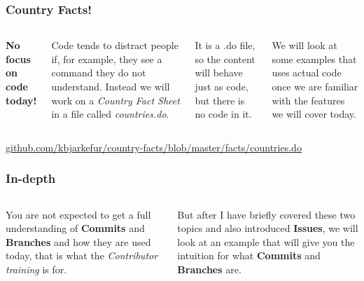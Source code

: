 \documentclass[aspectratio=169]{beamer} %
\newcommand{\trainingURL}[1]{{\color{blue}\url{#1}}}
\newcommand{\traininerUsername}{kbjarkefur}
\newcommand{\repoName}{\traininerUsername/country-facts}
\newcommand{\trainingRepoURL}[1]{\trainingURL{github.com/\repoName #1}}
\begin{document}
\begin{frame}
	\frametitle{Country Facts!}
	
	\begin{columns}[c] 
		
		
		\textbf{No focus on code today!}
		
		\vspace{.25cm}
		
		Code tends to distract people if, for example, they see a command they do not understand. Instead we will work on a \textit{Country Fact Sheet} in a file called \textit{countries.do}. 
		
		\vspace{.25cm}
		
		It is a .do file, so the content will behave just as code, but there is no code in it.

		\vspace{.25cm}

		We will look at some examples that uses actual code once we are familiar with the features we will cover today. 
		
		
	\end{columns}
	
	\vspace{.55cm}
	\trainingRepoURL{/blob/master/facts/countries.do}
		
	
\end{frame}

\begin{frame}
	\frametitle{In-depth}

	\begin{columns}[c] 
	
	
	
		You are not expected to get a full understanding of \textbf{Commits} and \textbf{Branches} and how they are used today, that is what the \textit{Contributor training} is for. 
		
		\vspace{.5cm}
		
		But after I have briefly covered these two topics and also introduced \textbf{Issues}, we will look at an example that will give you the intuition for what \textbf{Commits} and \textbf{Branches} are.
		

	\end{columns}		
		
\end{frame}
\end{document}
